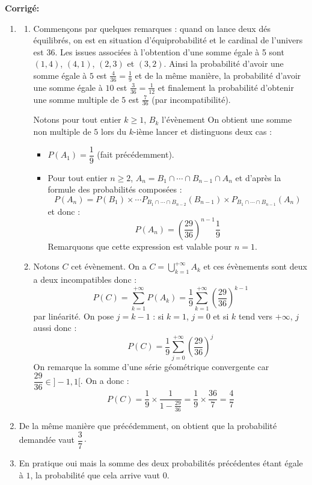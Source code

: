 \documentclass[a4paper,twoside,french,10pt]{VcCours}
\newcommand{\corr}{\textbf{Corrigé:}}
\begin{document}
\corr \begin{enumerate}
\item 
\begin{enumerate}
\item Commençons par quelques remarques : quand on lance deux dés équilibrés, on est en situation d'équiprobabilité et le cardinal de l'univers est $36$. Les issues associées à l'obtention d'une somme égale à 5 sont $(1,4)$, $(4,1)$, $(2,3)$ et $(3,2)$. Ainsi la probabilité d'avoir une somme égale à $5$ est $\frac{4}{36} = \frac{1}{9}$ et de la même manière, la probabilité d'avoir une somme égale à $10$ est $\frac{3}{36} = \frac{1}{12}$ et finalement la probabilité d'obtenir une somme multiple de $5$ est $\frac{7}{36}$ (par incompatibilité).



\noindent Notons pour tout entier $k \geq 1$, $B_k$ l'évènement \og On obtient une somme non multiple de $5$ lors du $k$-ième lancer \fg et distinguons deux cas :

\begin{itemize}
\item$P(A_1)= \dfrac{1}{9}$ (fait précédemment).
\item Pour tout entier $n \geq 2$, $A_n = B_1 \cap \cdots \cap B_{n-1} \cap A_n$ et d'après la formule des probabilités composées :
$$ P(A_n) = P(B_1) \times \cdots P_{B_1 \cap \cdots \cap B_{n-2}}(B_{n-1}) \times P_{B_1 \cap \cdots \cap B_{n-1}}(A_n)$$
et donc :
$$ \boxed{P(A_n) = \left( \frac{29}{36} \right)^{n-1}  \frac{1}{9}}$$
Remarquons que cette expression est valable pour $n=1$.
\end{itemize}
\item Notons $C$ cet évènement. On a $C = \bigcup_{k=1}^{+ \infty} A_k$ et ces évènements sont deux a deux incompatibles donc :
$$ P(C) = \sum_{k=1}^{+\infty} P(A_k)  = \frac{1}{9} \sum_{k=1}^{+\infty} \left( \frac{29}{36} \right)^{k-1} $$
par linéarité. On pose $j=k-1$ : si $k=1$, $j=0$ et si $k$ tend vers $+ \infty$, $j$ aussi donc :
$$ P(C) = \frac{1}{9}  \sum_{j=0}^{+\infty} \left( \frac{29}{36} \right)^{j}$$
On remarque la somme d'une série géométrique convergente car $\dfrac{29}{36} \in ]-1,1[$. On a donc :
$$P(C) = \frac{1}{9} \times \frac{1}{1-\frac{29}{36}} = \frac{1}{9} \times \frac{36}{7} = \frac{4}{7}$$
\end{enumerate}
\item De la même manière que précédemment, on obtient que la probabilité demandée vaut $\dfrac{3}{7}\cdot$
\item En pratique oui mais la somme des deux probabilités précédentes étant égale à $1$, la probabilité que cela arrive vaut $0$.
\end{enumerate}
\end{document}
